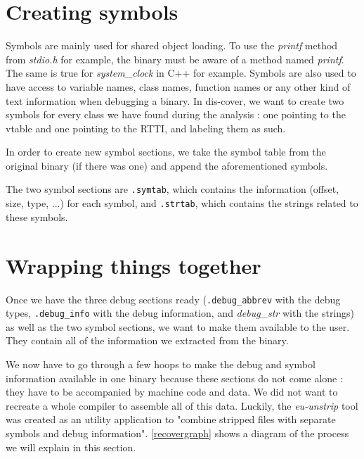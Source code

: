 \documentclass[a4paper,11pt,oneside]{report}
\begin{document}
\section{Creating symbols}

Symbols are mainly used for shared object loading. To use the \emph{printf}
method from \emph{stdio.h} for example, the binary must be aware of a
method named \emph{printf}. The same is true for
\emph{system\_clock} in C++ for example.
Symbols are also used to have access to variable names, class names, function
names or any other kind of text information when debugging a binary.
In dis-cover, we want to create two symbols for every class we have found
during the analysis : one pointing to the vtable and one pointing to the RTTI,
and labeling them as such.

In order to create new symbol sections, we take the symbol table from the 
original binary (if there was one) and append the aforementioned symbols.

The two symbol sections are \texttt{.symtab}, which contains the information 
(offset, size, type, ...) for each symbol, and \texttt{.strtab}, which contains 
the strings related to these symbols.


\section{Wrapping things together}
\label{wrappingimplementation}

Once we have the three debug sections ready
(\texttt{.debug\_abbrev} with the debug types, \texttt{.debug\_info} with the 
debug information, and \emph{debug\_str} with the strings)
as well as the two symbol sections, we want to make them available to the user.
They contain all of the information we extracted from the binary.

We now have to go through a few hoops to make the debug and symbol information
available in one binary because these sections do not come alone : they have to
be accompanied by machine code and data.
We did not want to recreate a whole compiler to assemble all of this data.
Luckily, the \emph{eu-unstrip} tool was created as an utility application
to "combine stripped files with separate symbols and debug information".
\autoref{recovergraph} shows a diagram of the process we will explain in this
section.
\end{document}
